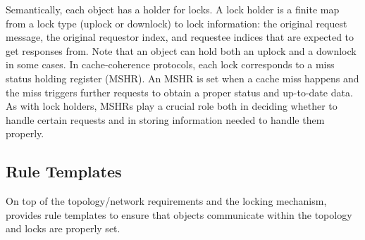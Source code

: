 \documentclass[sigplan,10pt,review,anonymous,screen]{acmart}\settopmatter{printfolios=true,printccs=false,printacmref=false}
\begin{document}
Semantically, each object has a holder for locks.
A lock holder is a finite map from a lock type (uplock or downlock) to lock information: the original request message, the original requestor index, and requestee indices that are expected to get responses from.
Note that an object can hold both an uplock and a downlock in some cases.
In cache-coherence protocols, each lock corresponds to a miss status holding register (MSHR).
An MSHR is set when a cache miss happens and the miss triggers further requests to obtain a proper status and up-to-date data.
As with \hemiola{} lock holders, MSHRs play a crucial role both in deciding whether to handle certain requests and in storing information needed to handle them properly.

\subsection{Rule Templates}
\label{sec-rule-templates}

\newcommand{\rtname}[1]{{\small\sf\bf #1}}

\newcommand{\uled}{\ensuremath{\textsf{UL}}}
\newcommand{\dled}{\ensuremath{\textsf{DL}}}
\newcommand{\ulfree}{\ensuremath{\textsf{UL}_{\times}}}
\newcommand{\dlfree}{\ensuremath{\textsf{DL}_{\times}}}

\newcommand{\setul}{\ensuremath{\textsf{UL}\Uparrow}}
\newcommand{\setdl}{\ensuremath{\textsf{DL}\Uparrow}}
\newcommand{\relul}{\ensuremath{\textsf{UL}\Downarrow}}
\newcommand{\reldl}{\ensuremath{\textsf{DL}\Downarrow}}
\newcommand{\stsilent}{\ensuremath{\textsf{SLT}}}

\newcommand{\ppo}[3]{\ensuremath{\{#1\}#2\lbrack#3\rbrack}}
\newcommand*{\bfrac}[2]{\genfrac{}{}{0pt}{}{#1}{#2}}

On top of the topology/network requirements and the locking mechanism, \hemiola{} provides rule templates to ensure that objects communicate within the topology and locks are properly set.
\end{document}

